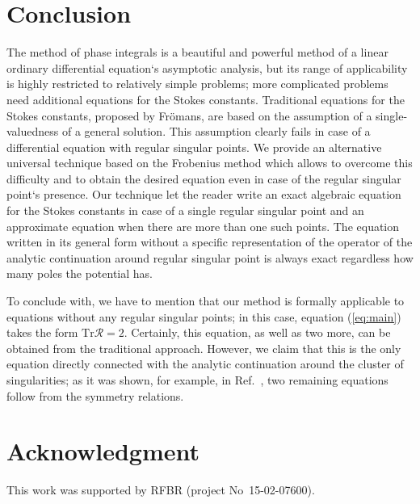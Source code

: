 \documentclass{ws-m3as}
\def\R{\bm{\mathcal{R}}}
\def\Tr{\mathrm{Tr}}
\newcommand\eref[1]{(\ref{#1})}
\begin{document}
\section{Conclusion \label{sec:con}}
The method of phase integrals is a beautiful and powerful method of a linear ordinary 
differential equation`s asymptotic analysis, but its range of applicability is highly 
restricted to relatively simple problems; more complicated problems need additional equations 
for the Stokes constants. Traditional equations for the Stokes constants, proposed by Fr\"omans\cite{frpaper},
are based on the assumption of a single-valuedness of a general solution. This assumption clearly fails
in case of a differential equation with regular singular points. We provide an alternative universal
technique based on the Frobenius method which allows to overcome this difficulty and to obtain the 
desired equation even in case of the regular singular point`s presence. 
Our technique let the reader write an exact algebraic equation for the Stokes constants in case
of a single regular singular point and an approximate equation when there are more than one such points.
The equation written in its general form without a specific representation of the operator of the analytic
continuation around regular singular point is always exact regardless how many poles the potential has. 

To conclude with, we have to mention that our method is formally applicable to equations without any regular
singular points; in this case, equation \eref{eq:main} takes the form $\Tr \R = 2$. Certainly, this equation,
as well as two more, can be obtained from the traditional approach\cite{frpaper}. However, we claim that this is the only equation
directly connected with the analytic continuation around the cluster of singularities; as it was shown,
for example, in Ref.~, two remaining equations follow from the symmetry relations.

\section*{Acknowledgment}
This work was supported by RFBR (project No~15-02-07600).
\end{document}
